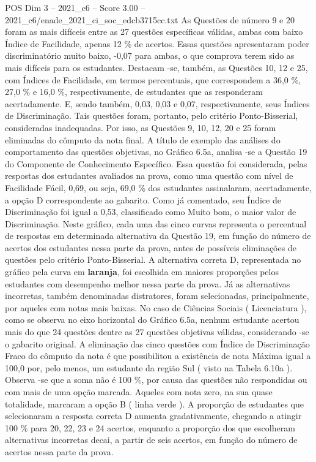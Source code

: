 \begin{textsample}{POS Dim 3 – 2021\_c6 – Score 3.00 – 2021\_c6/enade\_2021\_ci\_soc\_edcb3715cc.txt}
As Questões de número 9 e 20 foram as mais difíceis entre as 27 questões específicas válidas, ambas com baixo Índice de Facilidade, apenas 12 \% de acertos.
Essas questões apresentaram poder discriminatório muito baixo, -0,07 para ambas, o que comprova terem sido as mais difíceis para os estudantes.
Destacam -se, também, as Questões 10, 12 e 25, com Índices de Facilidade, em termos percentuais, que correspondem a 36,0 \%, 27,0 \% e 16,0 \%, respectivamente, de estudantes que as responderam acertadamente.
E, sendo também, 0,03, 0,03 e 0,07, respectivamente, seus Índices de Discriminação.
Tais questões foram, portanto, pelo critério Ponto-Bisserial, consideradas inadequadas.
Por isso, as Questões 9, 10, 12, 20 e 25 foram eliminadas do cômputo da nota final.
A título de exemplo das análises do comportamento das questões objetivas, no Gráfico 6.5a, analisa -se a Questão 19 do Componente de Conhecimento Específico.
Essa questão foi considerada, pelas respostas dos estudantes avaliados na prova, como uma questão com nível de Facilidade Fácil, 0,69, ou seja, 69,0 \% dos estudantes assinalaram, acertadamente, a opção D correspondente ao gabarito.
Como já comentado, seu Índice de Discriminação foi igual a 0,53, classificado como Muito bom, o maior valor de Discriminação.
Neste gráfico, cada uma das cinco curvas representa o percentual de respostas em determinada alternativa da Questão 19, em função do número de acertos dos estudantes nessa parte da prova, antes de possíveis eliminações de questões pelo critério Ponto-Bisserial.
A alternativa correta D, representada no gráfico pela curva em \textbf{laranja}, foi escolhida em maiores proporções pelos estudantes com desempenho melhor nessa parte da prova.
Já as alternativas incorretas, também denominadas distratores, foram selecionadas, principalmente, por aqueles com notas mais baixas.
No caso de Ciências Sociais ( Licenciatura ), como se observa no eixo horizontal do Gráfico 6.5a, nenhum estudante acertou mais do que 24 questões dentre as 27 questões objetivas válidas, considerando -se o gabarito original.
A eliminação das cinco questões com Índice de Discriminação Fraco do cômputo da nota é que possibilitou a existência de nota Máxima igual a 100,0 por, pelo menos, um estudante da região Sul ( visto na Tabela 6.10a ).
Observa -se que a soma não é 100 \%, por causa das questões não respondidas ou com mais de uma opção marcada.
Aqueles com nota zero, na sua quase totalidade, marcaram a opção B ( linha verde ).
A proporção de estudantes que selecionaram a resposta correta D aumenta gradativamente, chegando a atingir 100 \% para 20, 22, 23 e 24 acertos, enquanto a proporção dos que escolheram alternativas incorretas decai, a partir de seis acertos, em função do número de acertos nessa parte da prova.

\end{textsample}
